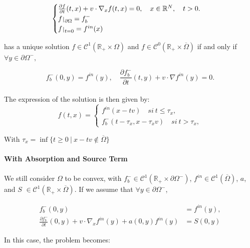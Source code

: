 \documentclass[a4paper, 11pt]{article}
\def\restriction#1#2{\mathchoice
	{\setbox1\hbox{${\displaystyle #1}_{\scriptstyle #2}$}
		\restrictionaux{#1}{#2}}
	{\setbox1\hbox{${\textstyle #1}_{\scriptstyle #2}$}
		\restrictionaux{#1}{#2}}
	{\setbox1\hbox{${\scriptstyle #1}_{\scriptscriptstyle #2}$}
		\restrictionaux{#1}{#2}}
	{\setbox1\hbox{${\scriptscriptstyle #1}_{\scriptscriptstyle #2}$}
		\restrictionaux{#1}{#2}}}
\def\restrictionaux#1#2{{#1\,\smash{\vrule height .8\ht1 depth .85\dp1}}_{\,#2}}
\begin{document}
\[
\begin{cases}
	\frac{\partial f}{\partial t}(t,x)+v \cdot \nabla_x f(t,x)=0, \quad x \in \mathbb{R}^N, \quad t>0.\\
	\restriction{f}{\partial \Omega}= f_b^-\\
	\restriction{f}{t=0}= f^{in}(x)
\end{cases}
\]

has a unique solution $f \in \mathcal{C}^1(\mathbb{R}_+ \times \Omega)$ and $f \in \mathcal{C}^0(\mathbb{R}_+ \times \overline{\Omega})$ if and only if $\forall y \in \partial \Omega^-,$

\[ f_b^-(0,y) = f^{in}(y), \quad \frac{\partial f_b^-}{\partial t}(t,y)+v \cdot \nabla f^{in}(y)=0. \]

\paragraph{}

The expression of the solution is then given by: 
\[
\boxed{
	f(t,x)= 
	\begin{cases}
		f^{in}(x-tv) \quad si~ t \leq \tau_x ,\\
		f_b^-(t-\tau_x,x-\tau_xv) \quad si~ t > \tau_x ,
	\end{cases}
}
\]

With $\tau_x= \inf \{t \geq 0~ | ~ x-tv \notin \overline{\Omega}\}$

\paragraph{With Absorption and Source Term}

\paragraph{}
We still consider $\Omega$ to be convex, with $f_b^- \in \mathcal{C}^1(\mathbb{R}_+ \times \partial \Omega^-)$, $f^{in} \in \mathcal{C}^1(\overline{\Omega})$, $a$, and $S$ $\in \mathcal{C}^1(\mathbb{R}_+ \times \overline{\Omega})$. If we assume that $\forall y \in \partial \Omega^-$,

\[
\begin{aligned}
	f_b^-(0,y) &= f^{in}(y), \\
	\frac{\partial f_b^-}{\partial t}(0,y) + v \cdot \nabla_x f^{in}(y) + a(0,y)f^{in}(y)&=S(0,y)
\end{aligned}
\]



In this case, the problem becomes:
\end{document}

